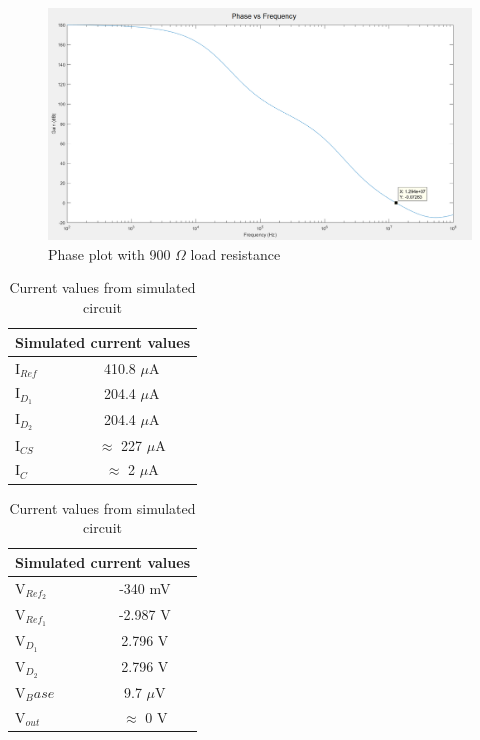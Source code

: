 \begin{figure}[H]
	\centering
	\includegraphics[width=0.7\linewidth]{CircuitDevelopment/phasefreqsim.png}
	\caption{Phase plot with 900 $\Omega$ load resistance}
	\label{fig:loadsweep}
\end{figure}



\begin{table}[H]
	\centering
	\caption{Current values from simulated circuit}
	\label{tab:simcircuitcurrent}
	\begin{tabular}{|l|c|}
		\hline
		\multicolumn{2}{|l|}{Simulated current values}                            \\ \hline
		I$_{Ref}$ & 410.8 $\mu$A                                                  \\ \hline
		I$_{D_1}$ & 204.4 $\mu$A                                                  \\ \hline
		I$_{D_2}$ & 204.4 $\mu$A                                                  \\ \hline
		I$_{CS}$  & $\approx$  227 $\mu$A                                         \\ \hline
		I$_{C}$   & $\approx$ 2  $\mu$A										 \\	\hline

	\end{tabular}
\end{table}


\begin{table}[H]
	\centering
	\caption{Current values from simulated circuit}
	\label{tab:simcircuitcurrent}
	\begin{tabular}{|l|c|}
		\hline
		\multicolumn{2}{|l|}{Simulated current values}                            \\ \hline
		V$_{Ref_2}$ & -340 mV                                                  \\ \hline
		V$_{Ref_1}$ & -2.987 V                                                 \\ \hline
		V$_{D_1}$ & 2.796 V                                                  \\ \hline
		V$_{D_2}$  & 2.796 V                                      \\ \hline
		V$_Base$   & 9.7 $\mu$V										 \\	\hline
		V$_{out}$ & $\approx$ 0 V \\ \hline
	\end{tabular}
\end{table}



